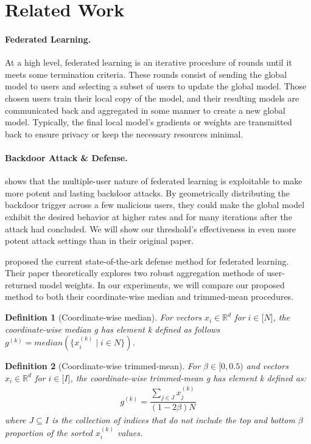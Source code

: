 \documentclass{article} %
\newtheorem{definition}{Definition}
\begin{document}
%
\section{Related Work}

\paragraph{Federated Learning.} At a high level, federated learning is an iterative procedure of rounds until it meets some termination criteria. These rounds consist of sending the global model to users and selecting a subset of users to update the global model. Those chosen users train their local copy of the model, and their resulting models are communicated back and aggregated in some manner to create a new global model. Typically, the final local model's gradients or weights are transmitted back to ensure privacy or keep the necessary resources minimal. 

\paragraph{Backdoor Attack \& Defense.} \cite{dba} shows that the multiple-user nature of federated learning is exploitable to make more potent and lasting backdoor attacks. By geometrically distributing the backdoor trigger across a few malicious users, they could make the global model exhibit the desired behavior at higher rates and for many iterations after the attack had concluded. We will show our threshold's effectiveness in even more potent attack settings than in their original paper.

\cite{trim-mean} proposed the current state-of-the-ark defense method for federated learning. Their paper theoretically explores two robust aggregation methods of user-returned model weights. In our experiments, we will compare our proposed method to both their coordinate-wise median and trimmed-mean procedures.

\begin{definition}[Coordinate-wise median] 
For vectors $x_i \in \mathbb{R}^{d}$ for $i \in \mathopen[N\mathclose]$, the coordinate-wise median g has element k defined as follows $g^{(k)} = median(\{x_i^{(k)} \mid i \in N\})$.
\end{definition}

\begin{definition}[Coordinate-wise trimmed-mean]
For $\beta \in \mathopen[ 0, 0.5 \mathclose)$ and vectors $x_i \in \mathbb{R}^{d}$ for $i \in \mathopen[I\mathclose]$, the coordinate-wise trimmed-mean g has element k defined as:
\begin{align*}
g^{(k)} = \dfrac{\sum_{j \in J}{x_j^{(k)}}}{(1 - 2\beta)N}
\end{align*}
where $J \subseteq I$ is the collection of indices that do not include the top and bottom $\beta$ proportion of the sorted $x_i^{(k)}$ values.
\end{definition}
\end{document}
